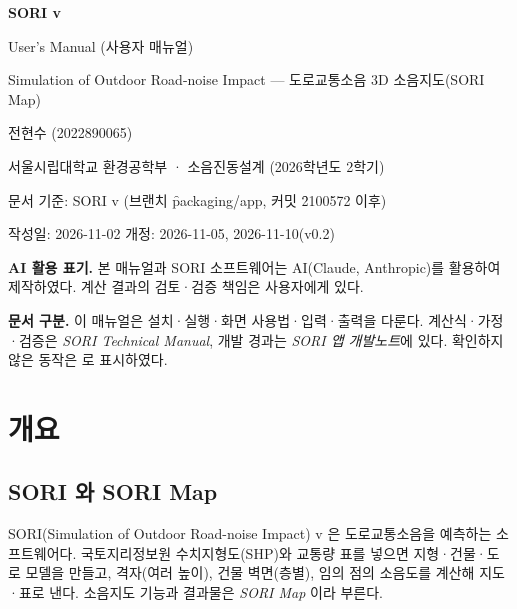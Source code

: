 \documentclass[10.5pt,a4paper]{article}
\begin{document}
\sloppy

\begin{titlepage}
\centering\vspace*{40mm}
{\sffamily\Huge\bfseries\color{navy} SORI v\soriversion\par}
\vspace{4mm}
{\sffamily\LARGE User's Manual (사용자 매뉴얼)\par}
\vspace{6mm}
{\sffamily\large Simulation of Outdoor Road-noise Impact — 도로교통소음 3D 소음지도(SORI Map)\par}
\vspace{20mm}
{\large 전현수 (2022890065)\par}
\vspace{2mm}
{서울시립대학교 환경공학부 · 소음진동설계 (2026학년도 2학기)\par}
\vspace{10mm}
{문서 기준: SORI v\soriversion{} (브랜치 \f{packaging/app}, 커밋 \f{2100572} 이후)\par}
{작성일: 2026-11-02 \quad 개정: 2026-11-05, 2026-11-10(v0.2)\par}
\vfill
\begin{minipage}{0.85\textwidth}\small
\textbf{AI 활용 표기.} 본 매뉴얼과 SORI 소프트웨어는 AI(Claude, Anthropic)를 활용하여 제작하였다. 계산 결과의 검토·검증 책임은 사용자에게 있다.\par\vspace{2mm}
\textbf{문서 구분.} 이 매뉴얼은 설치·실행·화면 사용법·입력·출력을 다룬다. 계산식·가정·검증은 \emph{SORI Technical Manual}, 개발 경과는 \emph{SORI 앱 개발노트}에 있다. 확인하지 않은 동작은 \chk{}로 표시하였다.
\end{minipage}
\end{titlepage}

\tableofcontents
\clearpage

\section{개요}

\subsection{SORI 와 SORI Map}
SORI(Simulation of Outdoor Road-noise Impact) v\soriversion{} 은 도로교통소음을 예측하는 소프트웨어다. 국토지리정보원 수치지형도(SHP)와 교통량 표를 넣으면 지형·건물·도로 모델을 만들고, 격자(여러 높이), 건물 벽면(층별), 임의 점의 소음도를 계산해 지도·표로 낸다. 소음지도 기능과 결과물은 \emph{SORI Map} 이라 부른다.
\end{document}
